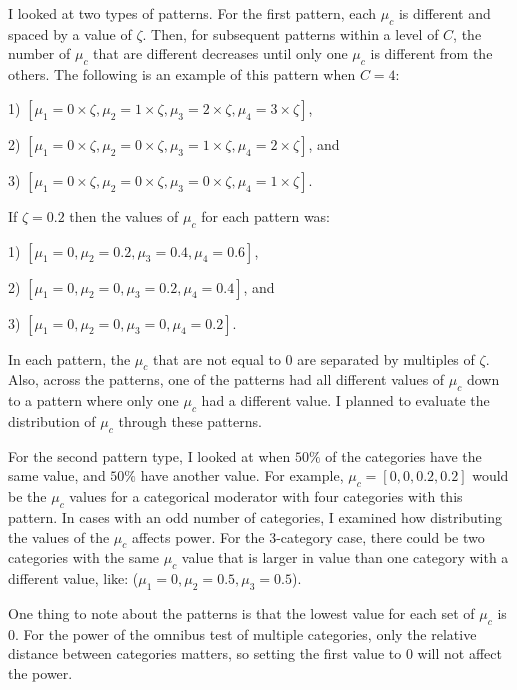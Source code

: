 I looked at two types of patterns. For the first pattern, each $\mu_c$ is different and spaced by a value of $\zeta$. Then, for subsequent patterns within a level of $C$, the number of $\mu_c$ that are different decreases until only one $\mu_c$ is different from the others. The following is an example of this pattern when $C=4$:

1) $[\mu_1 = 0 \times \zeta, \mu_2 = 1 \times \zeta, \mu_3 = 2 \times \zeta, \mu_4 = 3 \times \zeta ]$, 

2) $[\mu_1 = 0 \times \zeta, \mu_2 = 0 \times \zeta, \mu_3 = 1 \times \zeta, \mu_4 = 2 \times \zeta ]$, and 

3) $[\mu_1 = 0 \times \zeta, \mu_2 = 0 \times \zeta, \mu_3 = 0 \times \zeta, \mu_4 = 1 \times \zeta ]$. 

If $\zeta = 0.2$ then the values of $\mu_c$ for each pattern was: 

1) $[\mu_1 = 0 , \mu_2 = 0.2, \mu_3 = 0.4, \mu_4 = 0.6 ]$, 

2) $[\mu_1 = 0, \mu_2 = 0, \mu_3 = 0.2, \mu_4 = 0.4 ]$, and 

3) $[\mu_1 = 0, \mu_2 = 0, \mu_3 = 0, \mu_4 = 0.2]$. 

In each pattern, the $\mu_c$ that are not equal to $0$ are separated by multiples of $\zeta$. Also, across the patterns, one of the patterns had all different values of $\mu_c$ down to a pattern where only one $\mu_c$ had a different value. I planned to evaluate the distribution of $\mu_c$ through these patterns.

For the second pattern type, I looked at when $50\%$ of the categories have the same value, and $50\%$ have another value. For example, $\mu_c = [0, 0, 0.2, 0.2]$ would be the $\mu_c$ values for a categorical moderator with four categories with this pattern. In cases with an odd number of categories, I examined how distributing the values of the $\mu_c$ affects power. For the 3-category case, there could be two categories with the same $\mu_c$ value that is larger in value than one category with a different value, like: ($\mu_1 = 0, \mu_2 = 0.5, \mu_3 = 0.5$). 


One thing to note about the patterns is that the lowest value for each set of $\mu_c$ is $0$. For the power of the omnibus test of multiple categories, only the relative distance between categories matters, so setting the first value to $0$ will not affect the power. %

